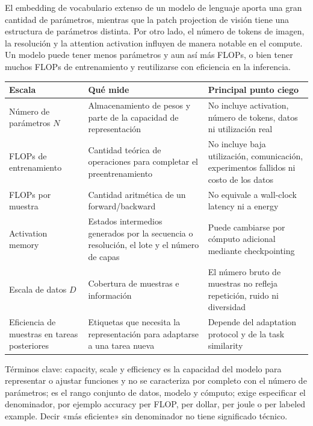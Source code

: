 \documentclass[a4paper]{article}
\begin{document}
El embedding de vocabulario extenso de un modelo de lenguaje aporta una gran cantidad de parámetros, mientras que la patch projection de visión tiene una estructura de parámetros distinta. Por otro lado, el número de tokens de imagen, la resolución y la attention activation influyen de manera notable en el compute. Un modelo puede tener menos parámetros y aun así más FLOPs, o bien tener muchos FLOPs de entrenamiento y reutilizarse con eficiencia en la inferencia.

\begin{longtable}{L{0.19\textwidth}L{0.31\textwidth}L{0.40\textwidth}}
\toprule
Escala & Qué mide & Principal punto ciego \\
\midrule
Número de parámetros $N$ & Almacenamiento de pesos y parte de la capacidad de representación & No incluye activation, número de tokens, datos ni utilización real \\
FLOPs de entrenamiento & Cantidad teórica de operaciones para completar el preentrenamiento & No incluye baja utilización, comunicación, experimentos fallidos ni costo de los datos \\
FLOPs por muestra & Cantidad aritmética de un forward/backward & No equivale a wall-clock latency ni a energy \\
Activation memory & Estados intermedios generados por la secuencia o resolución, el lote y el número de capas & Puede cambiarse por cómputo adicional mediante checkpointing \\
Escala de datos $D$ & Cobertura de muestras e información & El número bruto de muestras no refleja repetición, ruido ni diversidad \\
Eficiencia de muestras en tareas posteriores & Etiquetas que necesita la representación para adaptarse a una tarea nueva & Depende del adaptation protocol y de la task similarity \\
\bottomrule
\end{longtable}

\begin{knowledgebox}{Términos clave: capacity, scale y efficiency}
 es la capacidad del modelo para representar o ajustar funciones y no se caracteriza por completo con el número de parámetros;  es el rango conjunto de datos, modelo y cómputo;  exige especificar el denominador, por ejemplo accuracy per FLOP, per dollar, per joule o per labeled example. Decir «más eficiente» sin denominador no tiene significado técnico.
\end{knowledgebox}
\end{document}
